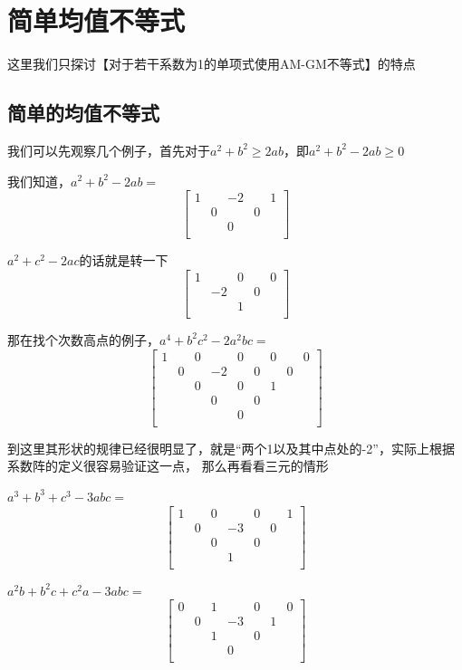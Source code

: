 \documentclass[UTF8]{ctexart}
\begin{document}
\section{简单均值不等式}
这里我们只探讨【对于若干系数为1的单项式使用AM-GM不等式】的特点

\subsection{简单的均值不等式}
我们可以先观察几个例子，首先对于$ a^{2}+b^{2}\geq2ab $，即$ a^{2}+b^{2}-2ab\geq0 $

我们知道，$ a^{2}+b^{2}-2ab= $
\renewcommand*{\arraystretch}{1.732}\[\left[\begin{matrix}
	1& & -2& &1 \\
	& 0& &0 & \\
	& & 0& & \\
\end{matrix}\right]\]

$ a^{2}+c^{2}-2ac $的话就是转一下
\renewcommand*{\arraystretch}{1.732}\[\left[\begin{matrix}
	1& & 0& &0 \\
	& -2& &0 & \\
	& & 1& & \\
\end{matrix}\right]\]

那在找个次数高点的例子，$ a^{4}+b^{2}c^{2}-2a^{2}bc= $
\renewcommand*{\arraystretch}{1.732}\[\left[\begin{matrix}
	1& & 0& &0& & 0& &0\\
    & 0& & -2&&0 & & 0&\\
    & & 0& &0& & 1& &\\
    & & & 0&& 0& & &\\
    & & & &0& & & &\\
\end{matrix}\right]\]

到这里其形状的规律已经很明显了，就是“两个1以及其中点处的-2”，实际上根据系数阵的定义很容易验证这一点，
那么再看看三元的情形

$ a^{3}+b^{3}+c^{3}-3abc= $
\renewcommand*{\arraystretch}{1.732}\[\left[\begin{matrix}
	1& & 0& &0& & 1\\
	& 0& & -3& &0 &\\
	& & 0& &0& & \\
	& & & 1& & &\\
\end{matrix}\right]\]

$ a^{2}b+b^{2}c+c^{2}a-3abc= $
\renewcommand*{\arraystretch}{1.732}\[\left[\begin{matrix}
	0& & 1& &0& & 0\\
	& 0& & -3& &1 &\\
	& & 1& &0& & \\
	& & & 0& & &\\
\end{matrix}\right]\]
\end{document}
